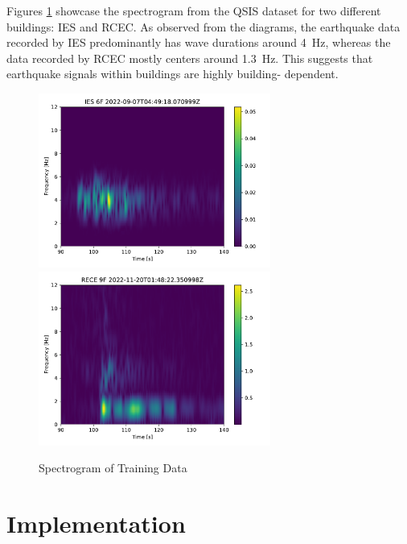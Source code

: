\documentclass[a4paper,12pt, oneside]{article}
\begin{document}
Figures \ref{spectrogram} showcase the spectrogram from the QSIS dataset for two different buildings: IES and RCEC. As observed from the diagrams, the earthquake data recorded by IES predominantly has wave durations around \SI{4}{\hertz}, whereas the data recorded by RCEC mostly centers around \SI{1.3}{\hertz}. This suggests that earthquake signals within buildings are highly building- dependent.

\begin{figure}[H]
\centering
\includegraphics[width = 3in]{Single_IES_spectrogram.pdf}
\includegraphics[width = 3in]{Single_RCEC_spectrogram.pdf}
\caption{Spectrogram of Training Data}\label{spectrogram}
\end{figure}

\newpage
\section{Implementation}
%
\newpage
%
\end{document}

